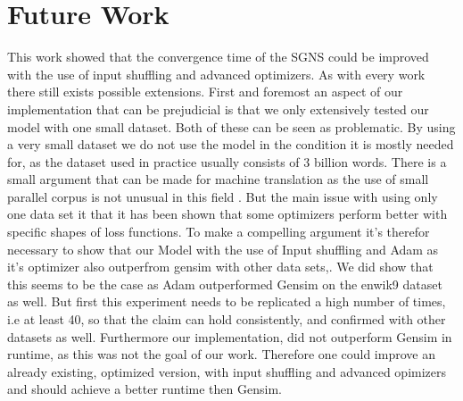 \section{Future Work}
This work showed that the convergence time of the SGNS could be improved with the use of input shuffling and advanced optimizers. As with every work there still exists  possible extensions. First and foremost an aspect of our implementation that can be prejudicial is that we only extensively tested our model with one small dataset. Both of these can be seen as problematic. By using a very small dataset we do not use the model in the condition it is mostly needed for, as the dataset used in practice usually consists of 3 billion words. There is a small argument that can be made for machine translation as the use of small parallel corpus is not unusual in this field . But the main issue with using only one data set it that it has been shown that some optimizers perform better with specific shapes of loss functions.  To make a compelling argument it's therefor necessary to show that our Model with the use of Input shuffling and Adam as it's optimizer also outperfrom gensim with other data sets,. We did show that this seems to be the case as Adam outperformed Gensim on the enwik9 dataset as well. But first this experiment needs to be replicated a high number of times, i.e at least 40, so that the claim can hold consistently, and confirmed with other datasets as well.
Furthermore our implementation, did not outperform Gensim in runtime, as this was not the goal of our work. Therefore one could improve an already existing, optimized version, with input shuffling and advanced opimizers and should achieve a better runtime then Gensim.
